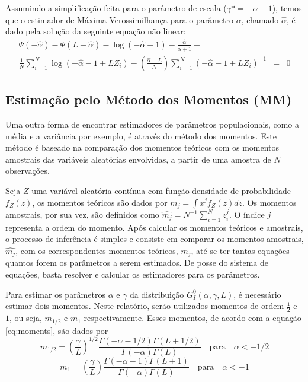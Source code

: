 \documentclass[12pt]{article}
\begin{document}
Assumindo a simplificação feita para o parâmetro de escala ($\gamma* = -\alpha - 1$), temos que o estimador de Máxima Verossimilhança para o parâmetro $\alpha$, chamado $\widehat{\alpha}$, é dado pela solução da seguinte equação não linear:
\begin{eqnarray}
    \Psi(-\widehat{\alpha}) - \Psi(L-\widehat{\alpha}) - \log(-\widehat{\alpha}-1) - \frac{\widehat{\alpha}}{\widehat{\alpha}+1} + \nonumber \\ \frac{1}{N}\sum_{i=1}^{N}\log(-\widehat{\alpha} - 1 + LZ_i) - \left ( \frac{\widehat{\alpha}-L}{N} \right )\sum_{i=1}^{N}(-\widehat{\alpha} - 1 + LZ_i)^{-1} & = & 0
\end{eqnarray}

\subsection{Estimação pelo Método dos Momentos (MM)}

Uma outra forma de encontrar estimadores de parâmetros populacionais, como a média e a variância por exemplo, é através do método dos momentos. Este método é baseado na comparação dos momentos teóricos com os momentos amostrais das variáveis aleatórias envolvidas, a partir de uma amostra de $N$ observações.

Seja $Z$ uma variável aleatória contínua com função densidade de probabilidade $f_Z(z)$, os momentos teóricos são dados por $m_j = \int x^jf_Z(z)dz$. Os momentos amostrais, por sua vez, são definidos como $\widehat{m_j} = N^{-1}\sum_{i=1}^{N}z_i^j$. O índice $\textit{j}$ representa a ordem do momento. Após calcular os momentos teóricos e amostrais, o processo de inferência é simples e consiste em comparar os momentos amostrais, $\widehat{m_j}$, com os correspondentes momentos teóricos, $m_j$, até se ter tantas equações quantos forem os parâmetros a serem estimados. De posse do sistema de equações, basta resolver e calcular os estimadores para os parâmetros.

Para estimar os parâmetros $\alpha$ e $\gamma$ da distribuição $G_I^0(\alpha, \gamma, L)$, é necessário estimar dois momentos. Neste relatório, serão utilizados momentos de ordem $\frac{1}{2}$ e $1$, ou seja, $m_{1/2}$ e $m_1$ respectivamente. Esses momentos, de acordo com a equação \eqref{eq:moments}, são dados por
\begin{equation}
    m_{1/2} = \left ( \frac{\gamma}{L}\right )^{1/2} \frac{\Gamma(-\alpha-1/2)\Gamma(L+1/2)}{\Gamma(-\alpha)\Gamma(L)} \quad \text{para} \quad \alpha < -1/2 \label{eq:m12}
\end{equation}
\begin{equation}
    m_{1} = \left ( \frac{\gamma}{L}\right ) \frac{\Gamma(-\alpha-1)\Gamma(L+1)}{\Gamma(-\alpha)\Gamma(L)} \quad \text{para} \quad \alpha < -1 \label{eq:m1}
\end{equation}
\end{document}
